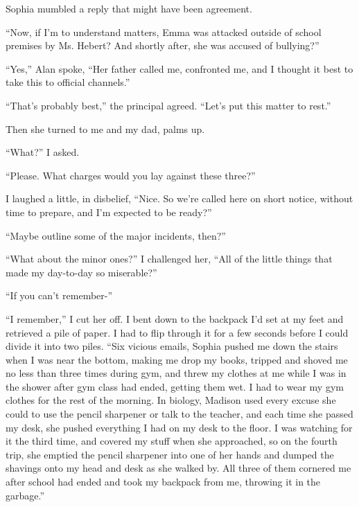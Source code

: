 Sophia mumbled a reply that might have been agreement.



``Now, if I'm to understand matters, Emma was attacked outside of school premises by Ms. Hebert?  And shortly after, she was accused of bullying?''



``Yes,'' Alan spoke, ``Her father called me, confronted me, and I thought it best to take this to official channels.''



``That's probably best,'' the principal agreed.  ``Let's put this matter to rest.''



Then she turned to me and my dad, palms up.



``What?'' I asked.



``Please.  What charges would you lay against these three?''



I laughed a little, in disbelief, ``Nice.  So we're called here on short notice, without time to prepare, and I'm expected to be ready?''



``Maybe outline some of the major incidents, then?''



``What about the minor ones?'' I challenged her, ``All of the little things that made my day-to-day so miserable?''



``If you can't remember-''



``I remember,'' I cut her off.  I bent down to the backpack I'd set at my feet and retrieved a pile of paper.  I had to flip through it for a few seconds before I could divide it into two piles.  ``Six vicious emails, Sophia pushed me down the stairs when I was near the bottom, making me drop my books, tripped and shoved me no less than three times during gym, and threw my clothes at me while I was in the shower after gym class had ended, getting them wet.  I had to wear my gym clothes for the rest of the morning.  In biology, Madison used every excuse she could to use the pencil sharpener or talk to the teacher, and each time she passed my desk, she pushed everything I had on my desk to the floor.  I was watching for it the third time, and covered my stuff when she approached, so on the fourth trip, she emptied the pencil sharpener into one of her hands and dumped the shavings onto my head and desk as she walked by.  All three of them cornered me after school had ended and took my backpack from me, throwing it in the garbage.''



